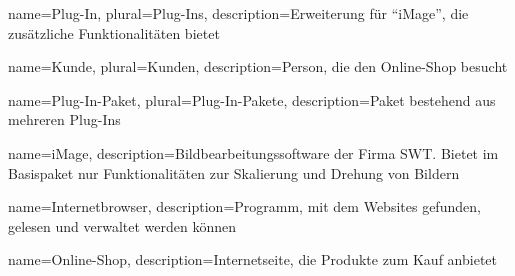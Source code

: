 %
%
\printglossaries
%
%
{
	name=Plug-In,
	plural=Plug-Ins,
	description={Erweiterung für \enquote{\gls{iMage}}, die zusätzliche Funktionalitäten bietet}
}

{
	name=Kunde,
	plural=Kunden,
	description={Person, die den \gls{Online-Shop} besucht}
}

{
	name=Plug-In-Paket,
	plural=Plug-In-Pakete,
	description={Paket bestehend aus mehreren \glspl{Plug-In}}
}

{
	name={iMage},
	description={Bildbearbeitungssoftware der Firma SWT. Bietet im Basispaket nur Funktionalitäten zur Skalierung und Drehung von Bildern}
}

{
	name={Internetbrowser},
	description={Programm, mit dem Websites gefunden, gelesen und verwaltet werden können}
}

{
	name={Online-Shop},
	description={Internetseite, die Produkte zum Kauf anbietet}
}